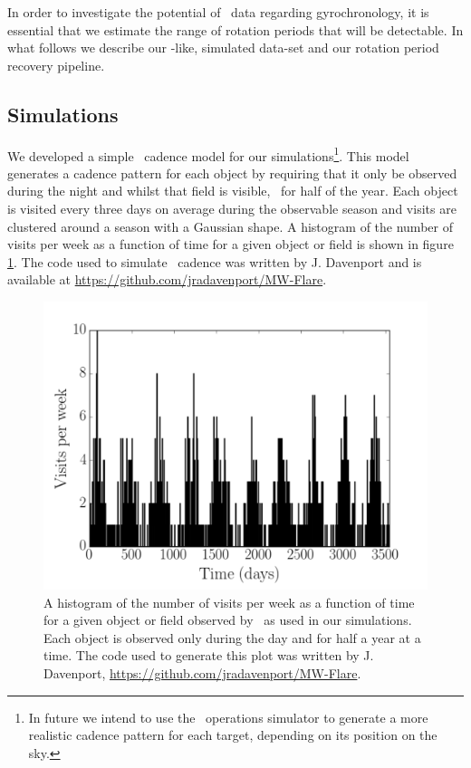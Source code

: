 In order to investigate the potential of \LSST\ data regarding gyrochronology,
it is essential that we estimate the range of rotation periods that will be
detectable.
In what follows we describe our \LSST-like, simulated data-set and our
rotation period recovery pipeline.

\subsection{Simulations}
We developed a simple \LSST\ cadence model for our simulations\footnote{In
future we intend to use the \LSST\ operations simulator
\citep[OpSim][]{Ridgway2012} to generate a more realistic cadence pattern for
each target, depending on its position on the sky.}.
This model generates a cadence pattern for each object by requiring that it
only be observed during the night and whilst that field is visible, \ie\ for
half of the year.
Each object is visited every three days on average during the observable
season and visits are clustered around a season with a Gaussian shape.
A histogram of the number of visits per week as a function of time for a given
object or field is shown in figure \ref{fig:cadence_hist}.
The code used to simulate \LSST\ cadence was written by J. Davenport and is
available at \url{https://github.com/jradavenport/MW-Flare}.

\begin{figure}
\begin{center}
\includegraphics[width=6in, clip=true]{figures/cadence_hist}
\caption[An \LSST\ cadence histogram.]
{A histogram of the number of visits per week as a function of time
for a given object or field observed by \LSST\, as used in our simulations.
Each object is observed only during the day and for half a year at a time.
The code used to generate this plot was written by J. Davenport,
\url{https://github.com/jradavenport/MW-Flare}.}
\label{fig:cadence_hist}
\end{center}
\end{figure}

